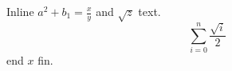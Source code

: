 \documentclass{article}
\begin{document}
Inline $a^2 + b_1 = \frac{x}{y}$ and $\sqrt{z}$ text.
\[ \sum_{i=0}^{n} \frac{\sqrt{i}}{2} \]
end $x$ fin.
\end{document}
